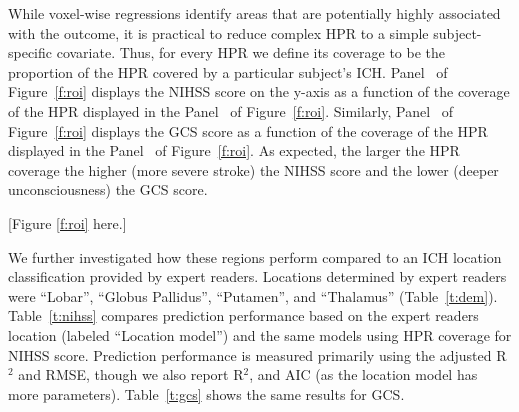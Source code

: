 \documentclass[10pt]{article}\usepackage[]{graphicx}\usepackage[]{color}
\begin{document}
%
%
%
%

While voxel-wise regressions identify areas that are potentially highly associated with the outcome, it is practical to reduce complex HPR to a simple subject-specific covariate. Thus, for every HPR we define its coverage to be the proportion of the HPR covered by a particular subject's ICH.  Panel~\protect{} of Figure~\ref{f:roi} displays the NIHSS score on the y-axis as a function of the coverage of the HPR displayed in the Panel~\protect{} of Figure~\ref{f:roi}. Similarly, Panel~\protect{} of Figure~\ref{f:roi} displays the GCS score as a function of the coverage of the HPR displayed in the Panel~\protect{} of Figure~\ref{f:roi}.
As expected, the larger the HPR coverage the higher (more severe stroke) the NIHSS score and the lower (deeper unconsciousness) the GCS score.

[Figure \ref{f:roi} here.]











We further investigated how these regions perform compared to an ICH location classification provided by expert readers.  Locations determined by expert readers were ``Lobar'', ``Globus Pallidus'', ``Putamen'', and ``Thalamus'' (Table~\ref{t:dem}). Table~\ref{t:nihss} compares prediction performance based on the expert readers location (labeled ``Location model'') and the same models using HPR coverage for NIHSS score. Prediction performance is measured primarily using the adjusted R$^2$ and RMSE, though we also report R$^2$, and AIC (as the location model has more parameters). Table~\ref{t:gcs} shows the same results for GCS.
\end{document}
